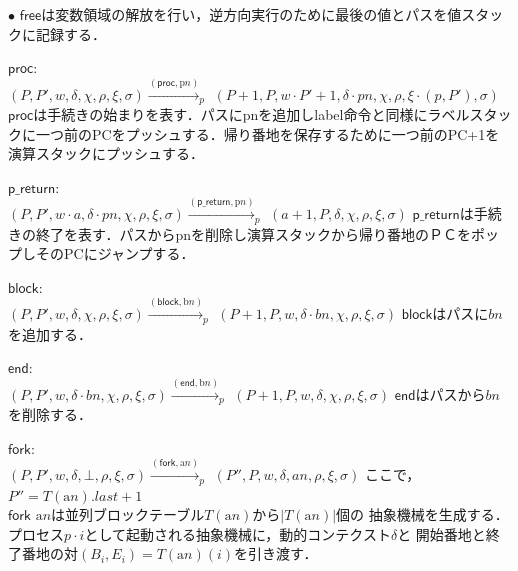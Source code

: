 \documentclass[submit,PRO]{ipsj}
\newcommand{\bcode}[1]{$\mathsf{#1}$}
\newcommand{\blabel}[1]{\mathrm{b}#1}
\newcommand{\plabel}[1]{\mathrm{p}#1}
\newcommand{\alabel}[1]{\mathrm{a}#1}
\begin{document}
\begin{list}{$\bullet$}{}
\bcode{free}は変数領域の解放を行い，逆方向実行のために最後の値とパスを値スタックに記録する．
\item \bcode{proc}:\\
$(P,P',w,\delta,\chi,\rho,\xi,\sigma)\xrightarrow{(\mathsf{proc},\plabel{n})}_p$\newline
\qquad $(P+1,P,w\cdot P'+1,\delta\cdot pn,\chi,\rho,\xi\cdot(p,P'),\sigma)$\newline
\bcode{proc}は手続きの始まりを表す．パスにpnを追加しlabel命令と同様にラベルスタックに一つ前のPCをプッシュする．帰り番地を保存するために一つ前のPC+1を演算スタックにプッシュする．
\item \bcode{p\_return}:\\
$(P,P',w\cdot a,\delta\cdot pn,\chi,\rho,\xi,\sigma)\xrightarrow{(\mathsf{p\_return},\plabel{n})}_p$\newline
\qquad $(a+1,P,\delta,\chi,\rho,\xi,\sigma)$\newline
\bcode{p\_return}は手続きの終了を表す．パスからpnを削除し演算スタックから帰り番地のＰＣをポップしそのPCにジャンプする．
\item \bcode{block}:\\
$(P,P',w,\delta,\chi,\rho,\xi,\sigma)\xrightarrow{(\mathsf{block},\blabel{n})}_p$\newline
\qquad $(P+1,P,w,\delta\cdot bn,\chi,\rho,\xi,\sigma)$\newline
\bcode{block}はパスに$bn$を追加する．
\item \bcode{end}:\\
$(P,P',w,\delta\cdot bn,\chi,\rho,\xi,\sigma)\xrightarrow{(\mathsf{end},\blabel{n})}_p$\newline
\qquad $(P+1,P,w,\delta,\chi,\rho,\xi,\sigma)$\newline
\bcode{end}はパスから$bn$を削除する．
\item \bcode{fork}:\\
$(P,P',w,\delta,\bot,\rho,\xi,\sigma)\xrightarrow{(\mathsf{fork},\alabel{n})}_p$\newline
\qquad $(P'',P,w,\delta,an,\rho,\xi,\sigma)$\newline
ここで，$P''=T(\alabel{n}).last+1$\\
\bcode{fork} $\alabel{n}$は並列ブロックテーブル$T(\alabel{n})$から$|T(\alabel{n})|$個の
抽象機械を生成する．プロセス$p\cdot i$として起動される抽象機械に，動的コンテクスト$\delta$と
開始番地と終了番地の対$(B_i,E_i)=T(\alabel{n})(i)$を引き渡す．

\end{list}
\end{document}
